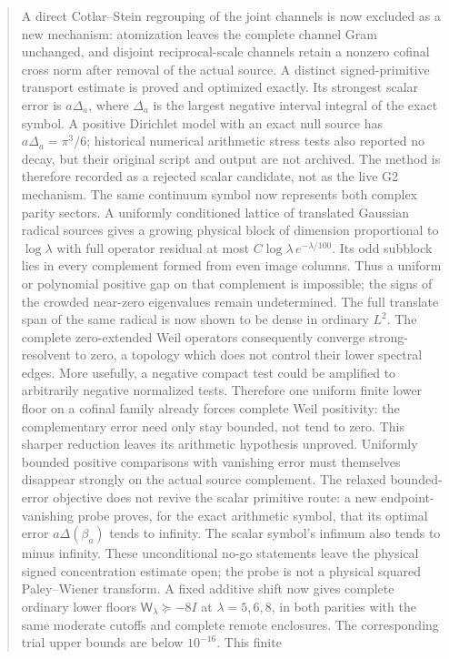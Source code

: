 \documentclass[11pt]{article}
\theoremstyle{remark}
\begin{document}
\begin{abstract}
A direct Cotlar--Stein regrouping of the joint channels is now excluded
as a new mechanism: atomization leaves the complete channel Gram
unchanged, and disjoint reciprocal-scale channels retain a nonzero
cofinal cross norm after removal of the actual source.  A distinct
signed-primitive transport estimate is proved and optimized exactly.
Its strongest scalar error is $a\Delta_a$, where $\Delta_a$ is the
largest negative interval integral of the exact symbol.  A positive
Dirichlet model with an exact null source has $a\Delta_a=\pi^3/6$;
historical numerical arithmetic stress tests also reported no decay,
but their original script and output are not archived.  The method
is therefore recorded as a rejected scalar candidate, not as the live
G2 mechanism.
The same continuum symbol now represents both complex parity sectors.
A uniformly conditioned lattice of translated Gaussian radical sources
gives a growing physical block of dimension proportional to $\log\lambda$
with full operator residual at most $C\log\lambda\,e^{-\lambda/100}$.
Its odd subblock lies in every complement formed from even image columns.
Thus a uniform or polynomial positive gap on that complement is impossible;
the signs of the crowded near-zero eigenvalues remain undetermined.
The full translate span of the same radical is now shown to be dense
in ordinary $L^2$. The complete zero-extended Weil operators consequently
converge strong-resolvent to zero, a topology which does not control their
lower spectral edges. More usefully, a negative compact test could be
amplified to arbitrarily negative normalized tests. Therefore one uniform
finite lower floor on a cofinal family already forces complete Weil
positivity: the complementary error need only stay bounded, not tend to
zero. This sharper reduction leaves its arithmetic hypothesis unproved.
Uniformly bounded positive comparisons with vanishing error must themselves
disappear strongly on the actual source complement.
The relaxed bounded-error objective does not revive the scalar
primitive route: a new endpoint-vanishing probe proves, for the exact
arithmetic symbol, that its optimal error $a\Delta(\beta_a)$ tends to
infinity. The scalar symbol's infimum also tends to minus infinity.
These unconditional no-go statements leave the physical signed
concentration estimate open; the probe is not a physical squared
Paley--Wiener transform.
A fixed additive shift now gives complete ordinary lower floors
$\mathsf W_\lambda\succeq-8I$ at $\lambda=5,6,8$, in both
parities with the same moderate cutoffs and complete remote enclosures.
The corresponding trial upper bounds are below $10^{-16}$. This finite

\end{abstract}
\end{document}
